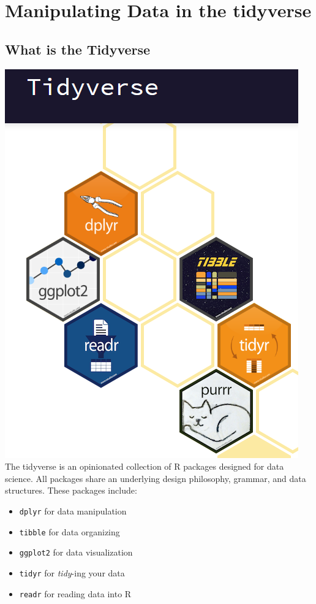 \documentclass[
]{book}
\providecommand{\tightlist}{%
  \setlength{\itemsep}{0pt}\setlength{\parskip}{0pt}}
\begin{document}
\hypertarget{manipulating-data-in-the-tidyverse}{%
\chapter{Manipulating Data in the tidyverse}\label{manipulating-data-in-the-tidyverse}}

\hypertarget{what-is-the-tidyverse}{%
\section{What is the Tidyverse}\label{what-is-the-tidyverse}}

\includegraphics{./figures/tidyverse.png}
The tidyverse is an opinionated collection of R packages designed for data science. All packages share an underlying design philosophy, grammar, and data structures. These packages include:

\begin{itemize}
\tightlist
\item
  \texttt{dplyr} for data manipulation
\item
  \texttt{tibble} for data organizing
\item
  \texttt{ggplot2} for data visualization
\item
  \texttt{tidyr} for \emph{tidy}-ing your data
\item
  \texttt{readr} for reading data into R
\end{itemize}
\end{document}
